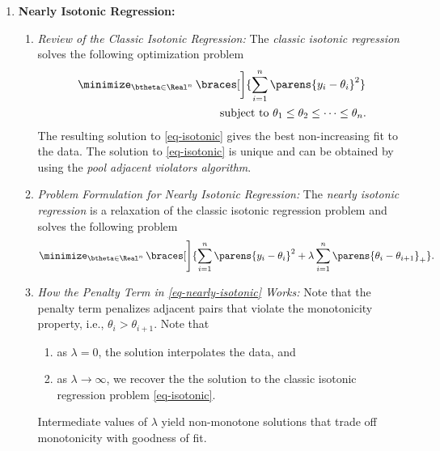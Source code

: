 \documentclass[12pt]{article}
\begin{document}
\begin{enumerate}[label=\textbf{\arabic*.}]
	\item \textbf{Nearly Isotonic Regression:} 
	\begin{enumerate}
		\item \textit{Review of the Classic Isotonic Regression:} The \textit{classic isotonic regression} solves the following optimization problem 
		\begin{equation}\label{eq-isotonic}
			\begin{aligned}
				\minimize_{\btheta \in \Real^n} & \, \braces[\bigg]{\sum_{i=1}^n \parens{y_i - \theta_i}^2}  \\ 
				& \qquad \text{ subject to } \theta_1 \le \theta_2 \le \cdots \le \theta_n. 
			\end{aligned}
		\end{equation}
		The resulting solution to \eqref{eq-isotonic} gives the best non-increasing fit to the data. The solution to \eqref{eq-isotonic} is unique and can be obtained by using the \textit{pool adjacent violators algorithm}. 
		
		\item \textit{Problem Formulation for Nearly Isotonic Regression:} The \textit{nearly isotonic regression} is a relaxation of the classic isotonic regression problem and solves the following problem 
		\begin{align}\label{eq-nearly-isotonic}
			\minimize_{\btheta \in \Real^n} & \, \braces[\Bigg]{\sum_{i=1}^n \parens{y_i - \theta_i}^2 + \lambda \sum_{i=1}^n \parens{\theta_i - \theta_{i+1}}_+}.  
		\end{align}
		
		\item \textit{How the Penalty Term in \eqref{eq-nearly-isotonic} Works:} Note that the penalty term penalizes adjacent pairs that violate the monotonicity property, i.e., $\theta_i > \theta_{i+1}$. Note that
		\begin{enumerate}
			\item as $\lambda = 0$, the solution interpolates the data, and 
			\item as $\lambda \to \infty$, we recover the the solution to the classic isotonic regression problem \eqref{eq-isotonic}. 
		\end{enumerate}
		Intermediate values of $\lambda$ yield non-monotone solutions that trade off monotonicity with goodness of fit. 
		
	\end{enumerate}
	
\end{enumerate}


\printbibliography
\end{document}
